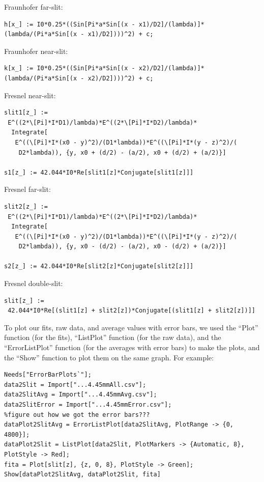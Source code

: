 \documentclass[prb,preprint]{revtex4-1}
\begin{document}
Fraunhofer far-slit:

\begin{verbatim}
h[x_] := I0*0.25*((Sin[Pi*a*Sin[(x - x1)/D2]/(lambda)]*(lambda/(Pi*a*Sin[(x - x1)/D2])))^2) + c;
\end{verbatim}

Fraunhofer near-slit:

\begin{verbatim}
k[x_] := I0*0.25*((Sin[Pi*a*Sin[(x - x2)/D2]/(lambda)]*(lambda/(Pi*a*Sin[(x - x2)/D2])))^2) + c;
\end{verbatim}

Fresnel near-slit:
\begin{verbatim}
slit1[z_] := 
 E^((2*\[Pi]*I*D1)/lambda)*E^((2*\[Pi]*I*D2)/lambda)*
  Integrate[
   E^((\[Pi]*I*(x0 - y)^2)/(D1*lambda))*E^((\[Pi]*I*(y - z)^2)/(
    D2*lambda)), {y, x0 + (d/2) - (a/2), x0 + (d/2) + (a/2)}]

s1[z_] := 42.044*I0*Re[slit1[z]*Conjugate[slit1[z]]]
\end{verbatim}

Fresnel far-slit:

\begin{verbatim}
slit2[z_] := 
 E^((2*\[Pi]*I*D1)/lambda)*E^((2*\[Pi]*I*D2)/lambda)*
  Integrate[
   E^((\[Pi]*I*(x0 - y)^2)/(D1*lambda))*E^((\[Pi]*I*(y - z)^2)/(
    D2*lambda)), {y, x0 - (d/2) - (a/2), x0 - (d/2) + (a/2)}]

s2[z_] := 42.044*I0*Re[slit2[z]*Conjugate[slit2[z]]]
\end{verbatim}

Fresnel double-slit:

\begin{verbatim}
slit[z_] := 
 42.044*I0*Re[(slit1[z] + slit2[z])*Conjugate[(slit1[z] + slit2[z])]]
\end{verbatim}

To plot our fits, raw data, and average values with error bars, we used the ``Plot'' function (for the fits), ``ListPlot'' function (for the raw data), and the ``ErrorListPlot'' function (for the averages with error bars) to make the plots, and the ``Show'' function to plot them on the same graph. For example:

\begin{verbatim}
Needs["ErrorBarPlots`"];
data2Slit = Import["...4.45mmAll.csv"];
data2SlitAvg = Import["...4.45mmAvg.csv"];
data2SlitError = Import["...4.45mmError.csv"];
%figure out how we got the error bars???
dataPlot2SlitAvg = ErrorListPlot[data2SlitAvg, PlotRange -> {0, 4800}];
dataPlot2Slit = ListPlot[data2Slit, PlotMarkers -> {Automatic, 8}, PlotStyle -> Red];
fita = Plot[slit[z], {z, 0, 8}, PlotStyle -> Green];
Show[dataPlot2SlitAvg, dataPlot2Slit, fita]
\end{verbatim}
\end{document}
